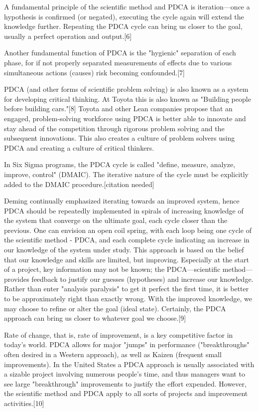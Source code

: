 A fundamental principle of the scientific method and PDCA is iteration—once a hypothesis is confirmed (or negated), executing the cycle again will extend the knowledge further. Repeating the PDCA cycle can bring us closer to the goal, usually a perfect operation and output.[6]

Another fundamental function of PDCA is the "hygienic" separation of each phase, for if not properly separated measurements of effects due to various simultaneous actions (causes) risk becoming confounded.[7]

PDCA (and other forms of scientific problem solving) is also known as a system for developing critical thinking. At Toyota this is also known as "Building people before building cars."[8] Toyota and other Lean companies propose that an engaged, problem-solving workforce using PDCA is better able to innovate and stay ahead of the competition through rigorous problem solving and the subsequent innovations. This also creates a culture of problem solvers using PDCA and creating a culture of critical thinkers.

In Six Sigma programs, the PDCA cycle is called "define, measure, analyze, improve, control" (DMAIC). The iterative nature of the cycle must be explicitly added to the DMAIC procedure.[citation needed]

Deming continually emphasized iterating towards an improved system, hence PDCA should be repeatedly implemented in spirals of increasing knowledge of the system that converge on the ultimate goal, each cycle closer than the previous. One can envision an open coil spring, with each loop being one cycle of the scientific method - PDCA, and each complete cycle indicating an increase in our knowledge of the system under study. This approach is based on the belief that our knowledge and skills are limited, but improving. Especially at the start of a project, key information may not be known; the PDCA—scientific method—provides feedback to justify our guesses (hypotheses) and increase our knowledge. Rather than enter "analysis paralysis" to get it perfect the first time, it is better to be approximately right than exactly wrong. With the improved knowledge, we may choose to refine or alter the goal (ideal state). Certainly, the PDCA approach can bring us closer to whatever goal we choose.[9]

Rate of change, that is, rate of improvement, is a key competitive factor in today's world. PDCA allows for major "jumps" in performance ("breakthroughs" often desired in a Western approach), as well as Kaizen (frequent small improvements). In the United States a PDCA approach is usually associated with a sizable project involving numerous people's time, and thus managers want to see large "breakthrough" improvements to justify the effort expended. However, the scientific method and PDCA apply to all sorts of projects and improvement activities.[10]
